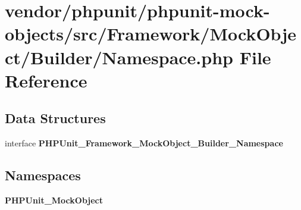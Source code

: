 \section{vendor/phpunit/phpunit-\/mock-\/objects/src/\+Framework/\+Mock\+Object/\+Builder/\+Namespace.php File Reference}
\label{_namespace_8php}
\subsection*{Data Structures}
\begin{DoxyCompactItemize}
\item 
interface {\bf P\+H\+P\+Unit\+\_\+\+Framework\+\_\+\+Mock\+Object\+\_\+\+Builder\+\_\+\+Namespace}
\end{DoxyCompactItemize}
\subsection*{Namespaces}
\begin{DoxyCompactItemize}
\item 
 {\bf P\+H\+P\+Unit\+\_\+\+Mock\+Object}
\end{DoxyCompactItemize}

